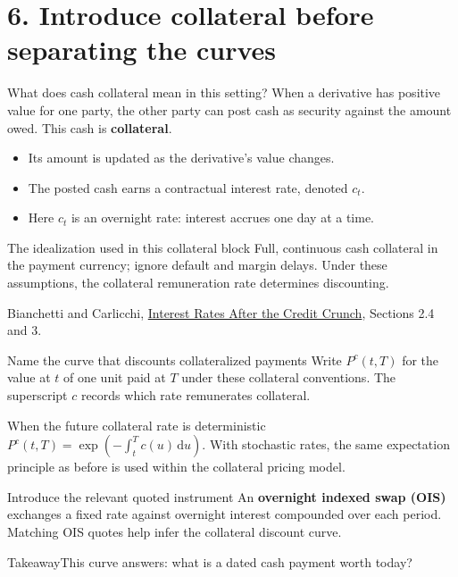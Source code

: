 \documentclass[handout,10pt,t,aspectratio=169]{beamer}
\newenvironment{keybox}{\begin{exampleblock}{Takeaway}}{\end{exampleblock}}
\newcommand{\dd}{\,\mathrm d}
\newcommand{\source}[1]{\vfill{\scriptsize\color{gray}#1\par}}
\begin{document}
\section{6. Introduce collateral before separating the curves}

\begin{frame}{What does cash collateral mean in this setting?}
When a derivative has positive value for one party, the other party can post
cash as security against the amount owed. This cash is \textbf{collateral}.
\begin{itemize}
\item Its amount is updated as the derivative's value changes.
\item The posted cash earns a contractual interest rate, denoted \(c_t\).
\item Here \(c_t\) is an overnight rate: interest accrues one day at a time.
\end{itemize}
\begin{block}{The idealization used in this collateral block}
Full, continuous cash collateral in the payment currency; ignore default and margin delays.
Under these assumptions, the collateral remuneration rate determines discounting.
\end{block}
\source{Bianchetti and Carlicchi, \href{https://arxiv.org/abs/1103.2567}{Interest Rates After the Credit Crunch}, Sections 2.4 and 3.}
\end{frame}

\begin{frame}{Name the curve that discounts collateralized payments}
Write \(P^c(t,T)\) for the value at \(t\) of one unit paid at \(T\)
under these collateral conventions. The superscript \(c\) records which rate remunerates collateral.
\begin{exampleblock}{When the future collateral rate is deterministic}
\(\displaystyle P^c(t,T)=\exp\!\left(-\int_t^T c(u)\dd u\right)\).
With stochastic rates, the same expectation principle as before is used
within the collateral pricing model.
\end{exampleblock}
\begin{block}{Introduce the relevant quoted instrument}
An \textbf{overnight indexed swap (OIS)} exchanges a fixed rate against
overnight interest compounded over each period. Matching OIS quotes help infer
the collateral discount curve.
\end{block}
\begin{keybox}This curve answers: what is a dated cash payment worth today?\end{keybox}
\end{frame}
\end{document}
